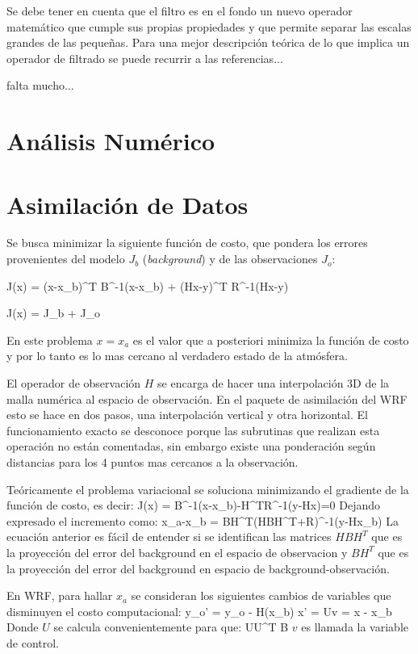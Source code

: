 Se debe tener en cuenta que el filtro es en el fondo un nuevo operador matemático que cumple sus propias propiedades y que permite separar las escalas grandes de las pequeñas. Para una mejor descripción teórica de lo que implica un operador de filtrado se puede recurrir a las referencias...

falta mucho...
\section{Análisis Numérico}

\section{Asimilación de Datos}
Se busca minimizar la siguiente función de costo, que pondera los errores provenientes del modelo $J_b$ (\emph{background}) y de las observaciones $J_o$:

\be 
J(x) = (x-x_b)^T B^{-1}(x-x_b) + (Hx-y)^T R^{-1}(Hx-y)
\ee 

\be 
J(x) = J_b + J_o
\ee 

En este problema $x=x_a$ es el valor que a posteriori minimiza la función de costo y por lo tanto es lo mas cercano al verdadero estado de la atmósfera.

El operador de observación $H$ se encarga de hacer una interpolación 3D de la malla numérica al espacio de observación. En el paquete de asimilación del WRF esto se hace en dos pasos, una interpolación vertical y otra horizontal. El funcionamiento exacto se desconoce porque las subrutinas que realizan esta operación no están comentadas, sin embargo existe una ponderación según distancias para los 4 puntos mas cercanos a la observación. 

Teóricamente el problema variacional se soluciona minimizando el gradiente de la función de costo, es decir:
\be 
\nabla J(x) = B^{-1}(x-x_b)-H^TR^{-1}(y-Hx)=0
\ee
Dejando expresado el incremento como:
\be 
x_a-x_b = BH^T(HBH^T+R)^{-1}(y-Hx_b)
\ee
La ecuación anterior es fácil de entender si se identifican las matrices $HBH^T$ que es la proyección del error del background en el espacio de observacion y $BH^T$ que es la proyección del error del background en espacio de background-observación.
\bigskip

En WRF, para hallar $x_a$ se consideran los siguientes cambios de variables que disminuyen el costo computacional:
\be 
y_o' = y_o - H(x_b)
\ee 
\be 
x' = Uv = x - x_b
\ee
Donde $U$ se calcula convenientemente para que:
\be 
UU^T \approx B
\ee
$v$ es llamada la variable de control.

